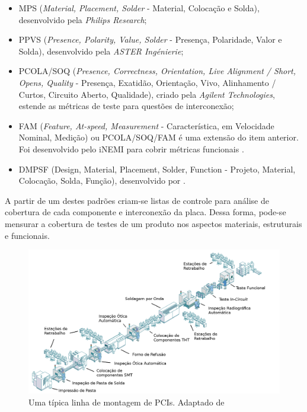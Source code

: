 \begin{itemize}
    \item MPS (\textit{Material, Placement, Solder} - Material, Colocação e Solda), desenvolvido pela \textit{Philips Research};
    \item PPVS (\textit{Presence,  Polarity, Value, Solder} - Presença, Polaridade, Valor e Solda), desenvolvido pela  \textit{ASTER Ingénierie};
    \item PCOLA/SOQ  (\textit{Presence, Correctness, Orientation,  Live Alignment / Short, Opens, Quality} - Presença, Exatidão, Orientação, Vivo, Alinhamento / Curtos, Circuito Aberto, Qualidade), criado pela \textit{Agilent Technologies}, estende as métricas de teste para questões de interconexão;
    \item FAM (\textit{Feature, At-speed, Measurement} - Característica, em Velocidade Nominal, Medição) ou PCOLA/SOQ/FAM é uma extensão do item anterior. Foi desenvolvido pelo iNEMI para cobrir métricas funcionais  \citep{ley2009defect}.
    \item DMPSF (Design, Material, Placement, Solder, Function - Projeto, Material, Colocação, Solda, Função), desenvolvido por \citet{lotz2006functional}.
\end{itemize}

A partir de um destes padrões criam-se listas de controle para análise de cobertura de cada componente e interconexão da placa. Dessa forma, pode-se mensurar a cobertura de testes de um produto nos aspectos materiais, estruturais e funcionais.

\begin{figure}[ht]
    \centering
    \includegraphics[width=1.1\linewidth]{linha.png}
    \caption{Uma típica linha de montagem de PCIs. Adaptado de \citet{agilenttechnologies2003}}
    \label{fig:linha}
\end{figure}


